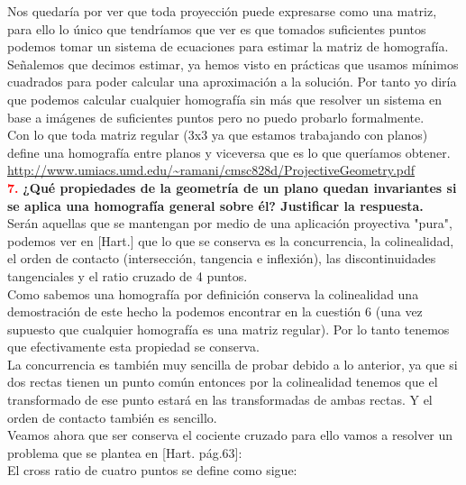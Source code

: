 \documentclass[10pt,a4paper]{article}
\begin{document}
Nos quedaría por ver que toda proyección puede expresarse como una matriz, para ello lo único que tendríamos que ver es que tomados suficientes puntos podemos tomar un sistema de ecuaciones para estimar la matriz de homografía. Señalemos que decimos estimar, ya hemos visto en prácticas que usamos mínimos cuadrados para poder calcular una aproximación a la solución. Por tanto yo diría que podemos calcular cualquier homografía sin más que resolver un sistema en base a imágenes de suficientes puntos pero no puedo probarlo formalmente.\\

Con lo que toda matriz regular (3x3 ya que estamos trabajando con planos) define una homografía entre planos y viceversa que es lo que queríamos obtener.\\

\url{http://www.umiacs.umd.edu/~ramani/cmsc828d/ProjectiveGeometry.pdf}\\

\textcolor{red}{\textbf{7.}} \textbf{¿Qué propiedades de la geometría de un plano quedan invariantes si se aplica una homografía general sobre él? Justificar la respuesta.}\\

Serán aquellas que se mantengan por medio de una aplicación proyectiva "pura", podemos ver en [Hart.] que lo que se conserva es la concurrencia, la colinealidad, el orden de contacto (intersección, tangencia e inflexión), las discontinuidades tangenciales y el ratio cruzado de 4 puntos.\\

Como sabemos una homografía por definición conserva la colinealidad una demostración de este hecho la podemos encontrar en la cuestión 6 (una vez supuesto que cualquier homografía es una matriz regular). Por lo tanto tenemos que efectivamente esta propiedad se conserva.\\

La concurrencia es también muy sencilla de probar debido a lo anterior, ya que si dos rectas tienen un punto común entonces por la colinealidad tenemos que el transformado de ese punto estará en las transformadas de ambas rectas. Y el orden de contacto también es sencillo.\\

Veamos ahora que ser conserva el cociente cruzado para ello vamos a resolver un problema que se plantea en [Hart. pág.63]:\\

El cross ratio de cuatro puntos se define como sigue:\\
\end{document}
